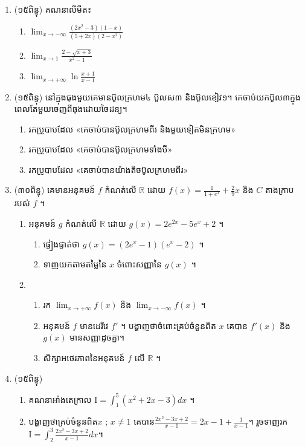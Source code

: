 \documentclass{officialexam}
\begin{document}
    \begin{enumerate}[I]
\item (១៥ពិន្ទុ)  គណនាលីមីត៖

\begin{enumerate}[k,3]
\item  $\lim_{x\to-\infty}\frac{\left(2x^2-3\right)(1-x)}{(5+2x)\left(2-x^2\right)}$
\item $\lim_{x\to 1}\frac{2-\sqrt{x+3}}{x^2-1}$
\item $\lim_{x\to +\infty}\ln \frac{x+1}{x-1}$
\end{enumerate}

\item (១៥ពិន្ទុ) នៅក្នុងធុងមួយគេមានប៊ូលក្រហម៤ ប៊ូលស៣ និងប៊ូលខៀវ១។ គេចាប់យកប៊ូល៣ក្នុងពេលតែមួយចេញពីធុងដោយចៃដន្យ។
\begin{enumerate}[k]
\item រកប្រូបាបដែល «គេចាប់បានប៊ូលក្រហមពីរ និងមួយទៀតមិនក្រហម»
\item រកប្រូបាបដែល «គេចាប់បានប៊ូលក្រហមទាំងបី»
\item រកប្រូបាបដែល «គេចាប់បានយ៉ាងតិចប៊ូលក្រហមពីរ»
\end{enumerate}
\item (៣០ពិន្ទុ)  គេមានអនុគមន៍ $f$ កំណត់លើ $\mathbb{R}$ ដោយ $f(x)=\frac{1}{1+e^x}+\frac{2}{9}x$ និង $C$ តាងក្រាបរបស់ $f$ ។
\begin{enumerate}[1]
\item អនុគមន៍ $g$ កំណត់លើ $\mathbb{R}$ ដោយ $g(x)=2e^{2x}-5e^x+2$ ។
		\begin{enumerate}[k]
		\item ផ្ទៀងផ្ទាត់ថា $g(x)=\left(2e^x-1\right)\left(e^x-2\right)$ ។
		\item ទាញយកតាមតម្លៃនៃ $x$ ចំពោះសញ្ញានៃ $g(x)$ ។
		\end{enumerate}
		\item 
 \begin{enumerate}[k]
	\item រក $\lim_{x\to +\infty}f(x)$ និង $\lim_{x\to -\infty}f(x)$ ។
		\item អនុគមន៍ $f$ មានដេរីវេ $f'$ ។
		 បង្ហាញថាចំពោះគ្រប់ចំនួនពិត $x$ គេបាន $f'(x)$ និង $g(x)$ មានសញ្ញាដូចគ្នា។
		\item សិក្សាអថេរភាពនៃអនុគមន៍ $f$ លើ $\mathbb{R}$ ។
\end{enumerate}
\end{enumerate}
\item (១៥ពិន្ទុ) 
		\begin{enumerate}[k] 
		\item គណនាអាំងតេក្រាល $\mathrm{I}=\int_1^5\left(x^2+2x-3\right)dx$ ។
		\item បង្ហាញថាគ្រប់ចំនួនពិត$x$ ; $x\neq 1$ គេបាន$\frac{2x^2-3x+2}{x-1}=2x-1+\frac{1}{x-1}$។ រួចទាញរក $\mathrm{I}=\int_2^3\frac{2x^2-3x+2}{x-1}dx$។
		\end{enumerate}
\end{enumerate}
\end{document}
